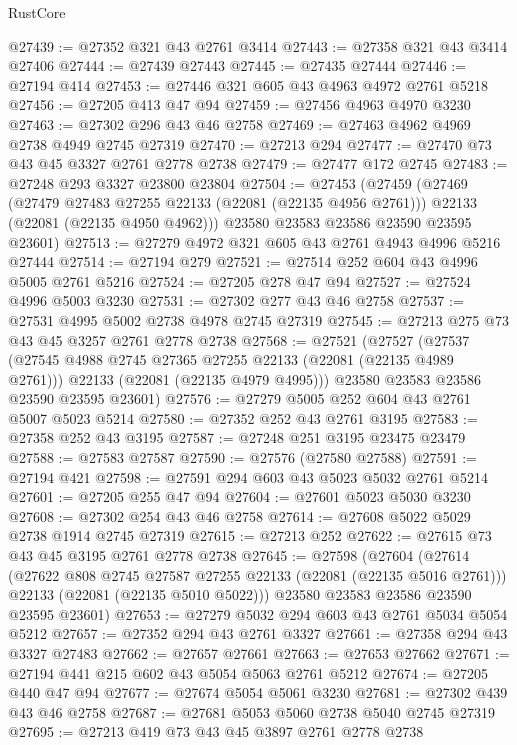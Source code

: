 \begin{lexlean}{RustCore}
\begin{coremodule}
@27439 := @27352 @321 @43 @2761 @3414
@27443 := @27358 @321 @43 @3414 @27406
@27444 := @27439 @27443
@27445 := @27435 @27444
@27446 := @27194 @414
@27453 := @27446 @321 @605 @43 @4963 @4972 @2761 @5218
@27456 := @27205 @413 @47 @94
@27459 := @27456 @4963 @4970 @3230
@27463 := @27302 @296 @43 @46 @2758
@27469 := @27463 @4962 @4969 @2738 @4949 @2745 @27319
@27470 := @27213 @294
@27477 := @27470 @73 @43 @45 @3327 @2761 @2778 @2738
@27479 := @27477 @172 @2745
@27483 := @27248 @293 @3327 @23800 @23804
@27504 := @27453
    (@27459
      (@27469
        (@27479 @27483 @27255 @22133 (@22081 (@22135 @4956 @2761)))
        @22133
        (@22081 (@22135 @4950 @4962)))
      @23580
      @23583
      @23586
      @23590
      @23595
      @23601)
@27513 := @27279 @4972 @321 @605 @43 @2761 @4943 @4996 @5216 @27444
@27514 := @27194 @279
@27521 := @27514 @252 @604 @43 @4996 @5005 @2761 @5216
@27524 := @27205 @278 @47 @94
@27527 := @27524 @4996 @5003 @3230
@27531 := @27302 @277 @43 @46 @2758
@27537 := @27531 @4995 @5002 @2738 @4978 @2745 @27319
@27545 := @27213 @275 @73 @43 @45 @3257 @2761 @2778 @2738
@27568 := @27521
    (@27527
      (@27537
        (@27545 @4988 @2745 @27365 @27255 @22133 (@22081 (@22135 @4989 @2761)))
        @22133
        (@22081 (@22135 @4979 @4995)))
      @23580
      @23583
      @23586
      @23590
      @23595
      @23601)
@27576 := @27279 @5005 @252 @604 @43 @2761 @5007 @5023 @5214
@27580 := @27352 @252 @43 @2761 @3195
@27583 := @27358 @252 @43 @3195
@27587 := @27248 @251 @3195 @23475 @23479
@27588 := @27583 @27587
@27590 := @27576 (@27580 @27588)
@27591 := @27194 @421
@27598 := @27591 @294 @603 @43 @5023 @5032 @2761 @5214
@27601 := @27205 @255 @47 @94
@27604 := @27601 @5023 @5030 @3230
@27608 := @27302 @254 @43 @46 @2758
@27614 := @27608 @5022 @5029 @2738 @1914 @2745 @27319
@27615 := @27213 @252
@27622 := @27615 @73 @43 @45 @3195 @2761 @2778 @2738
@27645 := @27598
    (@27604
      (@27614
        (@27622 @808 @2745 @27587 @27255 @22133 (@22081 (@22135 @5016 @2761)))
        @22133
        (@22081 (@22135 @5010 @5022)))
      @23580
      @23583
      @23586
      @23590
      @23595
      @23601)
@27653 := @27279 @5032 @294 @603 @43 @2761 @5034 @5054 @5212
@27657 := @27352 @294 @43 @2761 @3327
@27661 := @27358 @294 @43 @3327 @27483
@27662 := @27657 @27661
@27663 := @27653 @27662
@27671 := @27194 @441 @215 @602 @43 @5054 @5063 @2761 @5212
@27674 := @27205 @440 @47 @94
@27677 := @27674 @5054 @5061 @3230
@27681 := @27302 @439 @43 @46 @2758
@27687 := @27681 @5053 @5060 @2738 @5040 @2745 @27319
@27695 := @27213 @419 @73 @43 @45 @3897 @2761 @2778 @2738

\end{coremodule}
\end{lexlean}
